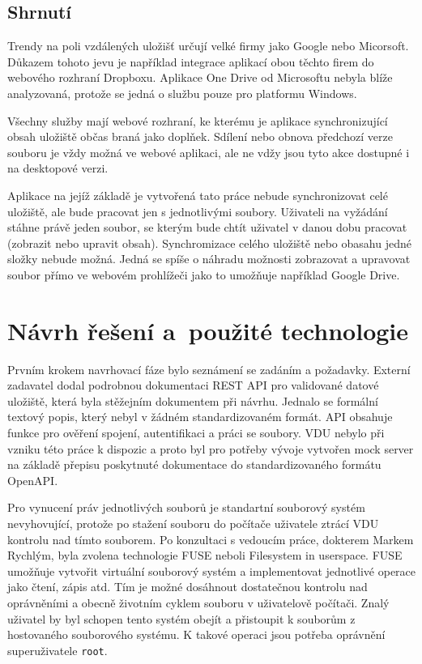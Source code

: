 \section{Shrnutí}

Trendy na poli vzdálených uložišť určují velké firmy jako Google nebo Micorsoft. Důkazem tohoto jevu je například integrace aplikací obou těchto firem do webového
rozhraní Dropboxu. Aplikace One Drive od Microsoftu nebyla blíže analyzovaná, protože se jedná o službu pouze pro platformu Windows. 

Všechny služby mají webové rozhraní, ke kterému je aplikace synchronizující obsah uložiště občas braná jako doplňek. Sdílení nebo obnova předchozí verze souboru
je vždy možná ve webové aplikaci, ale ne vdžy jsou tyto akce dostupné i na desktopové verzi.

Aplikace na jejíž základě je vytvořená tato práce nebude synchronizovat celé uložiště, ale bude pracovat jen s jednotlivými soubory. Uživateli na vyžádání stáhne 
právě jeden soubor, se kterým bude chtít uživatel v danou dobu pracovat (zobrazit nebo upravit obsah). Synchromizace celého uložiště nebo obasahu jedné složky nebude možná.
Jedná se spíše o náhradu možnosti zobrazovat a upravovat soubor přímo ve webovém prohlížeči jako to umožňuje například Google Drive.

\chapter{Návrh řešení a použité technologie}

Prvním krokem navrhovací fáze bylo seznámení se zadáním a požadavky. Externí zadavatel dodal podrobnou dokumentaci REST API pro validované datové uložiště, která
byla stěžejním dokumentem při návrhu. Jednalo se formální textový popis, který nebyl v žádném standardizovaném formát. API obsahuje funkce pro ověření spojení,
autentifikaci a práci se soubory. VDU nebylo při vzniku této práce k dispozic a proto byl pro potřeby vývoje vytvořen mock server na základě přepisu poskytnuté
dokumentace do standardizovaného formátu OpenAPI.

Pro vynucení práv jednotlivých souborů je standartní souborový systém nevyhovující, protože po stažení souboru do počítače uživatele ztrácí VDU kontrolu nad tímto
souborem. Po konzultaci s vedoucím práce, dokterem Markem Rychlým, byla zvolena technologie FUSE neboli Filesystem in userspace. FUSE umožňuje vytvořit virtuální
souborový systém a implementovat jednotlivé operace jako čtení, zápis atd. Tím je možné dosáhnout dostatečnou kontrolu nad oprávněními a obecně životním cyklem souboru
v uživatelově počítači. Znalý uživatel by byl schopen tento systém obejít a přistoupit k souborům z hostovaného souborového systému. K takové operaci jsou potřeba 
oprávnění superuživatele \texttt{root}.

